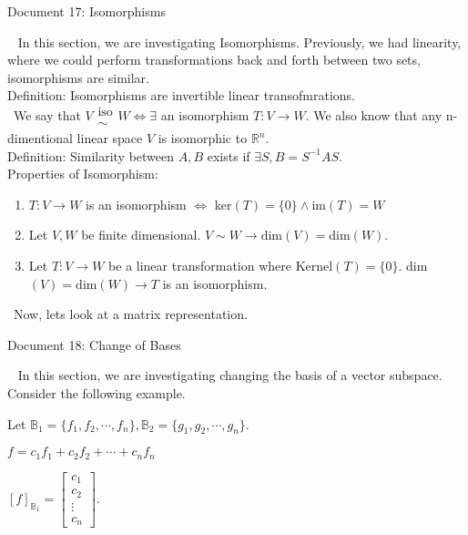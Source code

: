 \documentclass[12pt]{article}
\begin{document}
\newpage
\begin{center}
Document 17: Isomorphisms\\
\end{center}

\setlength{\leftskip}{0 in}
$\,\,\,$ In this section, we are investigating Isomorphisms. Previously, we had linearity, where we could perform transformations back and forth between two sets, isomorphisms are similar.\\

Definition: Isomorphisms are invertible linear transofmrations.\\

$\,\,\,$We say that $V\begin{matrix}\text{iso}\\\sim\end{matrix}W\Leftrightarrow \exists$ an isomorphism $T:V\rightarrow W$. We also know that any n-dimentional linear space $V$ is isomorphic to $\mathbb{R}^n$.\\

Definition: Similarity between $A,B$ exists if $\exists S,B=S^{-1}AS$.\\

Properties of Isomorphism:
\begin{enumerate}
\item $T:V\rightarrow W$ is an isomorphism $\Leftrightarrow$ ker$(T)=\lbrace 0\rbrace \land \text{im}(T)=W$
\item Let $V,W$ be finite dimensional. $V\sim W\rightarrow \text{dim}(V)=\text{dim}(W)$.
\item Let $T:V\rightarrow W$ be a linear transformation where Kernel$(T)=\lbrace 0 \rbrace$. dim$(V)=\text{dim}(W)\rightarrow T$ is an isomorphism.\\
\end{enumerate}

$\,\,\,$Now, lets look at a matrix representation.

\newpage
\begin{center}
Document 18: Change of Bases\\
\end{center}

\setlength{\leftskip}{0 in}
$\,\,\,$ In this section, we are investigating changing the basis of a vector subspace. Consider the following example.

\begin{center}
Let $\mathbb{B}_1=\lbrace f_1,f_2,\cdots,f_n\rbrace,\mathbb{B}_2=\lbrace g_1,g_2,\cdots,g_n\rbrace$.

$f=c_1f_1+c_2f_2+\cdots+c_nf_n$

$[f]_{\mathbb{B}_1}=\begin{bmatrix}c_1\\c_2\\\vdots\\c_n\end{bmatrix}$.
\end{center}
\end{document}
